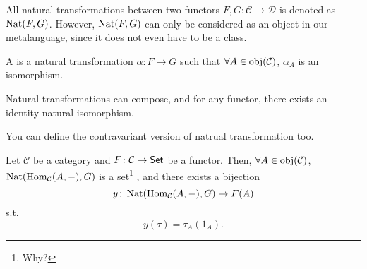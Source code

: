 \documentclass[openany, a5paper]{book}
\begin{document}
All natural transformations between two functors $F, G \colon \mathcal C \to \mathcal D$ is denoted as $\operatorname{Nat}(F, G)$. 
However, $\operatorname{Nat}(F, G)$ can only be considered as an object in our metalanguage, since it does not even have to be a class.

A  is a natural transformation $\alpha \colon F \to G$ such that $\forall A \in \operatorname{obj}(\mathcal C)$, $\alpha_A$ is an isomorphism.

Natural transformations can compose, and for any functor, there exists an identity natural isomorphism.

You can define the contravariant version of natrual transformation too.

\begin{theorem}%
	\label{theorem: Yoneda lemma}
	Let $\mathcal C$ be a category and $F \colon \mathcal C \to \operatorname{\mathsf{Set}}$ be a functor.
	Then, $\forall A \in \operatorname{obj}(\mathcal C)$, $\operatorname{Nat}(\operatorname{Hom}_{\mathcal C}(A, -), G)$ is a set\footnote{Why?}%
	, and there exists a bijection
	\begin{equation}
		y \colon \operatorname{Nat}(\operatorname{Hom}_{\mathcal C}(A, -), G) \to F(A)
	\end{equation}
	s.t.\ 
	\begin{equation}
		y(\tau) = \tau_A (1_A).
	\end{equation}
\end{theorem}
\end{document}
